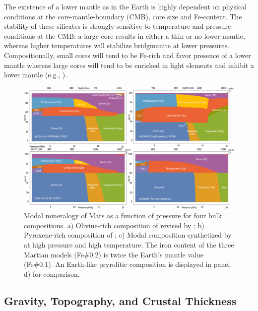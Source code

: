The existence of a lower mantle as in the Earth is highly dependent on physical conditions at the core-mantle-boundary (CMB), core size and Fe-content. The stability of these silicates is strongly sensitive to temperature and pressure conditions at the CMB: a large core results in either a thin or no lower mantle, whereas higher temperatures will stabilize bridgmanite at lower pressures. Compositionally, small cores will tend to be Fe-rich and favor presence of a lower mantle whereas large cores will tend to be enriched in light elements and inhibit a lower mantle (e.g., \cite{Khan2018}).
\begin{figure}[h!]
\begin{center}
\includegraphics[width=1.0\textwidth]
{figures/Fig_Mineralogy.png}
\caption{Modal mineralogy of Mars as a function of pressure for four bulk compositions. a) Olivine-rich composition of \cite{Dreibus&Wanke1985} revised by \cite{Taylor2013}; b) Pyroxene-rich composition of \cite{Sanloup1999}; c) Modal composition synthetized by \cite{Bertka1997} at high pressure and high temperature. The iron content of the three Martian models (Fe\#0.2) is twice the Earth's mantle value (Fe\#0.1). An Earth-like pryrolitic composition \citep{Ringwood1975} is displayed in panel d) for comparison.}
\label{fig:Fig_Mineralogy.png} 
\end{center}
\end{figure}

\subsection{Gravity, Topography, and Crustal Thickness}


